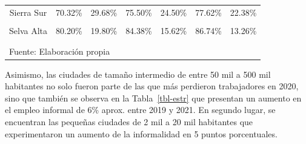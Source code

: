 \documentclass[
  letterpaper,
  12pt,
  oneside,
  spanish,
  doublespacing,
  headsepline,
  parskip]{MastersDoctoralThesis}
\begin{document}
\begin{table}[H]
\begin{tabular}{ccccccc}
Sierra Sur & 70.32\% & 29.68\% & 75.50\% & 24.50\% & 77.62\% & 22.38\%\\
\cellcolor{gray!6}{Selva Baja} & \cellcolor{gray!6}{74.84\%} & \cellcolor{gray!6}{25.16\%} & \cellcolor{gray!6}{80.69\%} & \cellcolor{gray!6}{19.31\%} & \cellcolor{gray!6}{83.04\%} & \cellcolor{gray!6}{16.96\%}\\
Selva Alta & 80.20\% & 19.80\% & 84.38\% & 15.62\% & 86.74\% & 13.26\%\\
\addlinespace
\cellcolor{gray!6}{Lima Metropolitana} & \cellcolor{gray!6}{58.60\%} & \cellcolor{gray!6}{41.40\%} & \cellcolor{gray!6}{58.22\%} & \cellcolor{gray!6}{41.78\%} & \cellcolor{gray!6}{61.99\%} & \cellcolor{gray!6}{38.01\%}\\
\bottomrule
\multicolumn{7}{l}{\textsuperscript{} Fuente: Elaboración propia}\\
\end{tabular}
\endgroup{}
\end{table}

Asimismo, las ciudades de tamaño intermedio de entre 50 mil a 500 mil
habitantes no solo fueron parte de las que más perdieron trabajadores en
2020, sino que también se observa en la Tabla~\ref{tbl-estr} que
presentan un aumento en el empleo informal de 6\% aprox. entre 2019 y
2021. En segundo lugar, se encuentran las pequeñas ciudades de 2 mil a
20 mil habitantes que experimentaron un aumento de la informalidad en 5
puntos porcentuales.
\end{document}
